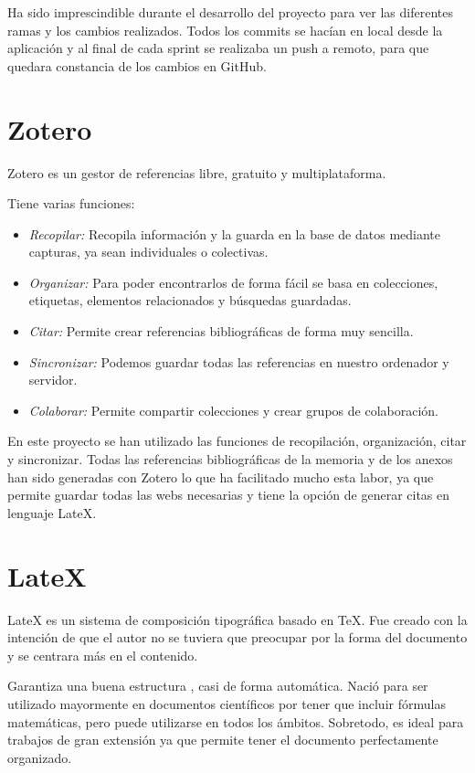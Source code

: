 Ha sido imprescindible durante el desarrollo del proyecto para ver las diferentes ramas y los cambios realizados. Todos los commits se hacían en local desde la aplicación y al final de cada sprint se realizaba un push a remoto, para que quedara constancia de los cambios en GitHub.

\section{Zotero}
Zotero \cite{zotero} es un gestor de referencias libre, gratuito y multiplataforma.

Tiene varias funciones:
\begin{itemize}
\tightlist
    \item\textit{Recopilar: } Recopila información y la guarda en la base de datos mediante capturas, ya sean individuales o colectivas.
    \item\textit{Organizar:} Para poder encontrarlos de forma fácil se basa en colecciones, etiquetas, elementos relacionados y búsquedas guardadas.
    \item\textit{Citar:} Permite crear referencias bibliográficas de forma muy sencilla.
    \item\textit{Sincronizar:} Podemos guardar todas las referencias en nuestro ordenador y servidor.
    \item\textit{Colaborar:} Permite compartir colecciones y crear grupos de colaboración.
\end{itemize}

En este proyecto se han utilizado las funciones de recopilación, organización, citar y sincronizar. Todas las referencias bibliográficas de la memoria y de los anexos han sido generadas con Zotero lo que ha facilitado mucho esta labor, ya que permite guardar todas las webs necesarias y tiene la opción de generar citas en lenguaje LateX.

\section{LateX}
LateX \cite{latex} es un sistema de composición tipográfica basado en TeX. Fue creado con la intención de que el autor no se tuviera que preocupar por la forma del documento y se centrara más en el contenido.

Garantiza una buena estructura , casi de forma automática. Nació para ser utilizado mayormente en documentos científicos por tener que incluir fórmulas matemáticas, pero puede utilizarse en todos los ámbitos. Sobretodo, es ideal para trabajos de gran extensión ya que permite tener el documento perfectamente organizado.

